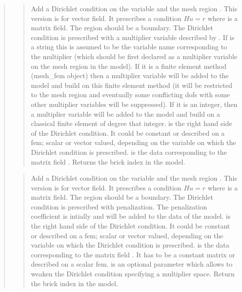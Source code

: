 \documentclass[a4paper,11pt,english]{sphinxmanual}
\begin{document}
\begin{quote}
\sphinxAtStartPar
{}
\begin{quote}

\sphinxAtStartPar
Add a Dirichlet condition on the variable  and the mesh
region .  This version is for vector field.
It prescribes a condition \(Hu = r\)
where  is a matrix field. The region should be a boundary. The Dirichlet
condition is prescribed with a multiplier variable described by
. If  is a string this is assumed
to be the variable name corresponding to the multiplier (which should be
first declared as a multiplier variable on the mesh region in the model).
If it is a finite element method (mesh\_fem object) then a multiplier
variable will be added to the model and build on this finite element
method (it will be restricted to the mesh region  and eventually
some conflicting dofs with some other multiplier variables will be
suppressed). If it is an integer, then a  multiplier variable will be
added to the model and build on a classical finite element of degree
that integer.  is the right hand side of  the
Dirichlet condition. It could be constant or described on a fem; scalar
or vector valued, depending on the variable on which the Dirichlet
condition is prescribed.  is the data
corresponding to the matrix field .
Returns the brick index in the model.
\end{quote}

\sphinxAtStartPar
{}
\begin{quote}

\sphinxAtStartPar
Add a Dirichlet condition on the variable  and the mesh
region . This version is for vector field.
It prescribes a condition \(Hu = r\)
where  is a matrix field.
The region should be a boundary. The Dirichlet
condition is prescribed with penalization. The penalization coefficient
is intially  and will be added to the data of the model.
 is the right hand side of the Dirichlet condition.
It could be constant or described on a fem; scalar or vector valued,
depending on the variable on which the Dirichlet condition is prescribed.
 is the data
corresponding to the matrix field . It has to be a constant matrix
or described on a scalar fem.
 is an optional parameter which allows to weaken the
Dirichlet condition specifying a multiplier space.
Return the brick index in the model.
\end{quote}


\end{quote}
\end{document}
